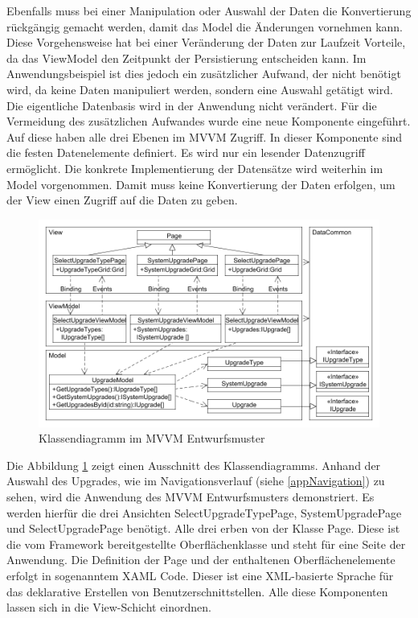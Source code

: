Ebenfalls muss bei einer Manipulation oder Auswahl der Daten die Konvertierung rückgängig gemacht werden, damit das Model die Änderungen vornehmen kann. Diese Vorgehensweise hat bei einer Veränderung der Daten zur Laufzeit Vorteile, da das ViewModel den Zeitpunkt der Persistierung entscheiden kann. Im Anwendungsbeispiel ist dies jedoch ein zusätzlicher Aufwand, der nicht benötigt wird, da keine Daten manipuliert werden, sondern eine Auswahl getätigt wird. Die eigentliche Datenbasis wird in der Anwendung nicht verändert.
Für die Vermeidung des zusätzlichen Aufwandes wurde eine neue Komponente eingeführt. Auf diese haben alle drei Ebenen im MVVM Zugriff. In dieser Komponente sind die festen Datenelemente definiert. Es wird nur ein lesender Datenzugriff ermöglicht. Die konkrete Implementierung der Datensätze wird weiterhin im Model vorgenommen. Damit muss keine Konvertierung der Daten erfolgen, um der View einen Zugriff auf die Daten zu geben. \par 
\begin{figure}
\centering
\includegraphics[width=\hsize]{images/uml_diagramm}
\caption{Klassendiagramm im MVVM Entwurfsmuster}
\label{mvvmApp}
\end{figure}
Die Abbildung \ref{mvvmApp} zeigt einen Ausschnitt des Klassendiagramms. Anhand der Auswahl des Upgrades, wie im Navigationsverlauf (siehe \ref{appNavigation}) zu sehen, wird die Anwendung des MVVM Entwurfsmusters demonstriert. Es werden hierfür die drei Ansichten SelectUpgradeTypePage, SystemUpgradePage und SelectUpgradePage benötigt. Alle drei erben von der Klasse Page. Diese ist die vom Framework bereitgestellte Oberflächenklasse und steht für eine Seite der Anwendung. Die Definition der Page und der enthaltenen Oberflächenelemente erfolgt in sogenanntem XAML Code. Dieser ist eine XML-basierte Sprache für das deklarative Erstellen von Benutzerschnittstellen. Alle diese Komponenten lassen sich in die View-Schicht einordnen. \par 

